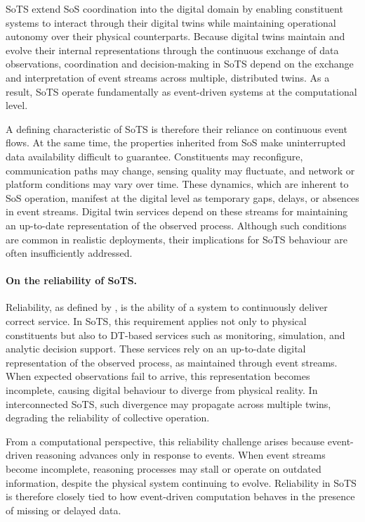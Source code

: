SoTS extend SoS coordination into the digital domain by enabling constituent systems to interact through their digital twins while maintaining operational autonomy over their physical counterparts. Because digital twins maintain and evolve their internal representations through the continuous exchange of data observations, coordination and decision-making in SoTS depend on the exchange and interpretation of event streams across multiple, distributed twins. As a result, SoTS operate fundamentally as event-driven systems at the computational level.

A defining characteristic of SoTS is therefore their reliance on continuous event flows. At the same time, the properties inherited from SoS make uninterrupted data availability difficult to guarantee. Constituents may reconfigure, communication paths may change, sensing quality may fluctuate, and network or platform conditions may vary over time. These dynamics, which are inherent to SoS operation, manifest at the digital level as temporary gaps, delays, or absences in event streams. Digital twin services depend on these streams for maintaining an up-to-date representation of the observed process. Although such conditions are common in realistic deployments, their implications for SoTS behaviour are often insufficiently addressed.

\paragraph{On the reliability of SoTS.}
Reliability, as defined by \citet{avizienis2004basic}, is the ability of a system to continuously deliver correct service. In SoTS, this requirement applies not only to physical constituents but also to DT-based services such as monitoring, simulation, and analytic decision support. These services rely on an up-to-date digital representation of the observed process, as maintained through event streams. When expected observations fail to arrive, this representation becomes incomplete, causing digital behaviour to diverge from physical reality. In interconnected SoTS, such divergence may propagate across multiple twins, degrading the reliability of collective operation.

From a computational perspective, this reliability challenge arises because event-driven reasoning advances only in response to events. When event streams become incomplete, reasoning processes may stall or operate on outdated information, despite the physical system continuing to evolve. Reliability in SoTS is therefore closely tied to how event-driven computation behaves in the presence of missing or delayed data.


